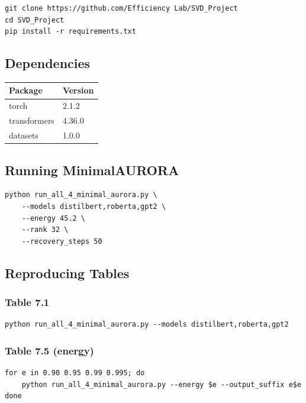 \begin{lstlisting}
git clone https://github.com/Efficiency Lab/SVD_Project
cd SVD_Project
pip install -r requirements.txt
\end{lstlisting}

\subsection{Dependencies}

\begin{table}[H]
\centering
\small
\begin{tabular}{ll}
\toprule
\textbf{Package} & \textbf{Version} \\
\midrule
torch & 2.1.2 \\
transformers & 4.36.0 \\
datasets & 1.0.0 \\
\bottomrule
\end{tabular}
\end{table}

\subsection{Running MinimalAURORA}

\begin{lstlisting}
python run_all_4_minimal_aurora.py \
    --models distilbert,roberta,gpt2 \
    --energy 45.2 \
    --rank 32 \
    --recovery_steps 50
\end{lstlisting}

\subsection{Reproducing Tables}

\subsubsection{Table 7.1}
\begin{lstlisting}
python run_all_4_minimal_aurora.py --models distilbert,roberta,gpt2
\end{lstlisting}

\subsubsection{Table 7.5 (energy)}
\begin{lstlisting}
for e in 0.90 0.95 0.99 0.995; do
    python run_all_4_minimal_aurora.py --energy $e --output_suffix e$e
done
\end{lstlisting}

